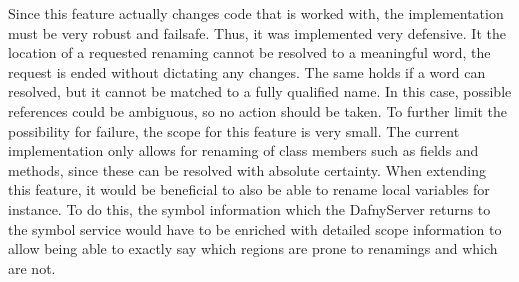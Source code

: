 Since this feature actually changes code that is worked with, the implementation must be very robust and failsafe. Thus, it was implemented very defensive. It the location of a requested renaming cannot be resolved to a meaningful word, the request is ended without dictating any changes. The same holds if a word can resolved, but it cannot be matched to a fully qualified name. In this case, possible references could be ambiguous, so no action should be taken. To further limit the possibility for failure, the scope for this feature is very small. The current implementation only allows for renaming of class members such as fields and methods, since these can be resolved with absolute certainty.\newline
When extending this feature, it would be beneficial to also be able to rename local variables for instance. To do this, the symbol information which the DafnyServer returns to the symbol service would have to be enriched with detailed scope information to allow being able to exactly say which regions are prone to renamings and which are not. 

